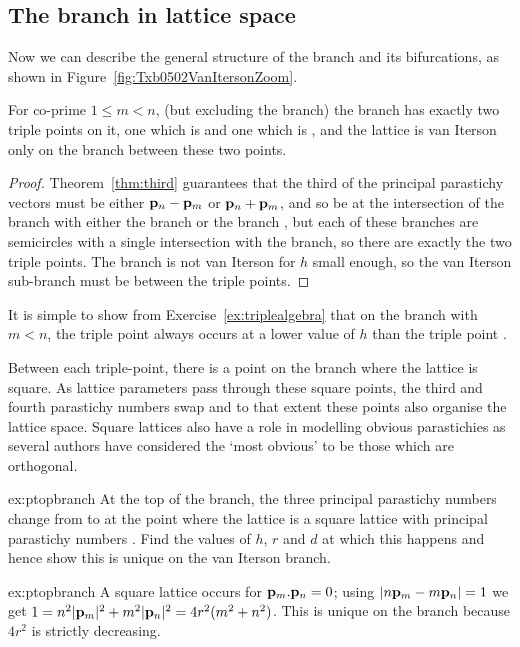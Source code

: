 \subsection{The  branch in lattice space}
Now we can describe the general structure of the  branch and its bifurcations, as shown in Figure~\ref{fig:Txb0502VanItersonZoom}.
\begin{theorem}
	For co-prime $1\leq m<n$,  (but excluding the  branch) the  branch has exactly two triple points on it, one which is  and one which is ,  and the lattice is van Iterson only on the branch between these two points.
\end{theorem}
\begin{proof}
	Theorem~\ref{thm:third} guarantees that the third of the principal parastichy vectors must be either ${\mathbf p}_{n}-{\mathbf p}_{m}$  or  ${\mathbf p}_{n}+{\mathbf p}_{m}$, 
	and so be at the intersection of the branch with either the branch   or the branch  , but each of these branches are semicircles with a single intersection with the  branch, so there are exactly the two triple points.  The  branch is not van Iterson for $h$ small enough, so the van Iterson sub-branch must be between the triple points. 
\end{proof}
It is simple to show from Exercise~\ref{ex:triplealgebra} that on the   branch with $m<n$, the triple point  always occurs at a lower value of $h$ than the triple point . 


Between each triple-point, there is a point on the branch where the lattice is square. 
As lattice parameters pass through these square points, the third and fourth parastichy numbers swap and to that extent these points also organise the lattice space. 
Square lattices also have a role in modelling obvious parastichies as several authors have considered the `most obvious' to be those which are orthogonal. 
\begin{jExercise}{ex:ptopbranch}
	At the top of the  branch, the three principal parastichy numbers change from  to  at the point where the lattice is a square lattice with principal parastichy numbers . Find the values of $h$, $r$ and $d$ at which this happens and hence show this is unique on the van Iterson branch.
\end{jExercise}
\begin{jAnswer}{ex:ptopbranch}
	A square lattice occurs for ${\mathbf p}_{m}.{\mathbf p}_{n}=0$; using $|n{\mathbf p}_{m}-m{\mathbf p}_{n}|=1$ we get
	$1=n^2|{\mathbf p}_{m}|^2+m^2|{\mathbf p}_{n}|^2= 4 r^2 ( m^2+n^2)$. This is unique on the branch because  $4r^2$ is strictly decreasing.
\end{jAnswer}
\newpage
